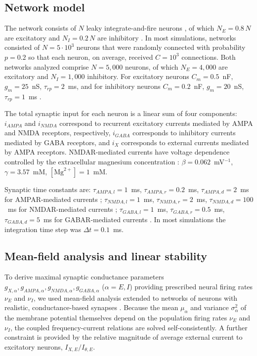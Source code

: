 \documentclass[11pt]{article}
\begin{document}
\subsection{Network model}

The network consists of $N$ leaky integrate-and-fire neurons \citep{dayan2001theoretical}, of which $N_E = 0.8\,N$ are excitatory and $N_I = 0.2\,N$ are inhibitory \citep{abeles1991corticonics,braitenberg1998cortex}. In most simulations, networks consisted of $N = 5 \cdot 10^3$ neurons that were randomly connected with probability $p = 0.2$ so that each neuron, on average, received $C = 10^3$ connections. Both networks analyzed comprise $N = 5{,}000$ neurons, of which $N_E = 4{,}000$ are excitatory and $N_I = 1{,}000$ inhibitory. For excitatory neurons $C_m = 0.5$~nF, $g_m = 25$~nS, $\tau_{rp} = 2$~ms, and for inhibitory neurons $C_m = 0.2$~nF, $g_m = 20$~nS, $\tau_{rp} = 1$~ms \citep{koch2004biophysics}.

The total synaptic input for each neuron is a linear sum of four components: $i_{AMPA}$ and $i_{NMDA}$ correspond to recurrent excitatory currents mediated by AMPA and NMDA receptors, respectively, $i_{GABA}$ corresponds to inhibitory currents mediated by GABA receptors, and $i_X$ corresponds to external currents mediated by AMPA receptors. NMDAR-mediated currents have voltage dependence controlled by the extracellular magnesium concentration \citep{jahr1990voltage}: $\beta = 0.062$~mV$^{-1}$, $\gamma = 3.57$~mM, $[\text{Mg}^{2+}] = 1$~mM.

Synaptic time constants are: $\tau_{AMPA,l} = 1$~ms, $\tau_{AMPA,r} = 0.2$~ms, $\tau_{AMPA,d} = 2$~ms for AMPAR-mediated currents \citep{zhou1998ampa}; $\tau_{NMDA,l} = 1$~ms, $\tau_{NMDA,r} = 2$~ms, $\tau_{NMDA,d} = 100$~ms for NMDAR-mediated currents \citep{hestrin1990analysis}; $\tau_{GABA,l} = 1$~ms, $\tau_{GABA,r} = 0.5$~ms, $\tau_{GABA,d} = 5$~ms for GABAR-mediated currents \citep{gupta2000organizing}. In most simulations the integration time step was $\Delta t = 0.1$~ms.

\subsection{Mean-field analysis and linear stability}

To derive maximal synaptic conductance parameters $g_{X,\alpha}, g_{AMPA,\alpha}, g_{NMDA,\alpha}, g_{GABA,\alpha}$ ($\alpha = E, I$) providing prescribed neural firing rates $\nu_E$ and $\nu_I$, we used mean-field analysis \citep{amit1997model,brunel2000dynamics,vanvreeswijk1996chaos} extended to networks of neurons with realistic, conductance-based synapses \citep{brunel2001effects,renart2003mean}. Because the mean $\mu_\alpha$ and variance $\sigma_\alpha^2$ of the membrane potential themselves depend on the population firing rates $\nu_E$ and $\nu_I$, the coupled frequency-current relations are solved self-consistently. A further constraint is provided by the relative magnitude of average external current to excitatory neurons, $I_{X,E}/I_{\theta,E}$.
\end{document}
